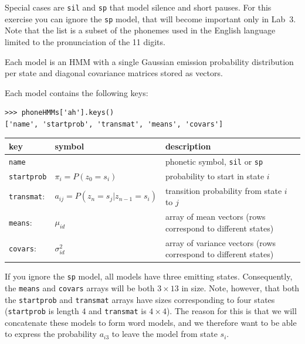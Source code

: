 \documentclass{nada-ten}
\begin{document}
Special cases are \texttt{sil} and \texttt{sp} that model silence and short pauses.
For this exercise you can ignore the \texttt{sp} model, that will become important only in Lab~3.
Note that the list is a subset of the phonemes used in the English language limited to the pronunciation of the 11 digits.

Each model is an HMM with a single Gaussian emission probability distribution per state and diagonal covariance matrices stored as vectors.

Each model contains the following keys:
\begin{verbatim}
>>> phoneHMMs['ah'].keys()
['name', 'startprob', 'transmat', 'means', 'covars']
\end{verbatim}


\begin{center}
\begin{tabular}{llp{}}
  key & symbol & description \\
  \hline
  \texttt{name} & & phonetic symbol, \texttt{sil} or \texttt{sp} \\
  \texttt{startprob} & $\pi_i = P(z_0=s_i)$ & probability to start in state $i$ \\
  \texttt{transmat}: & $a_{ij} = P(z_n=s_j|z_{n-1}=s_i)$ & transition probability from state $i$ to $j$ \\
  \texttt{means}: & $\mu_{id}$ & array of mean vectors (rows correspond to different states) \\
  \texttt{covars}: & $\sigma^2_{id}$ & array of variance vectors (rows correspond to different states) \\
  \hline
\end{tabular}
\end{center}

If you ignore the \texttt{sp} model, all models have three emitting states.
Consequently, the \texttt{means} and \texttt{covars} arrays will be both $3\times 13$ in size.
Note, however, that both the \texttt{startprob} and \texttt{transmat} arrays have sizes corresponding to four states (\texttt{startprob} is length $4$ and \texttt{transmat} is $4 \times 4$).
The reason for this is that we will concatenate these models to form word models, and we therefore want to be able to express the probability $a_{i3}$ to leave the model from state $s_i$.
\end{document}
